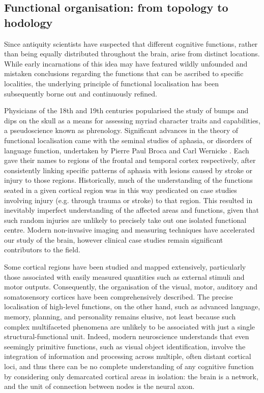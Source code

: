 \subsection{Functional organisation: from topology to hodology}

Since antiquity  scientists have suspected that different cognitive functions, rather than being equally distributed throughout the brain, arise from distinct locations.
While early incarnations of this idea may have featured wildly unfounded and mistaken conclusions regarding the functions that can be ascribed to specific localities, the underlying principle of functional localisation has been subsequently borne out and continuously refined.

Physicians of the 18th and 19th centuries popularised the study of bumps and dips on the skull as a means for assessing myriad character traits and capabilities, a pseudoscience known as phrenology.
Significant advances in the theory of functional localisation came with the seminal studies of aphasia, or disorders of language function, undertaken by Pierre Paul Broca and Carl Wernicke .
Each gave their names to regions of the frontal and temporal cortex respectively, after consistently linking specific patterns of aphasia with lesions caused by stroke or injury to those regions.
Historically, much of the understanding of the functions seated in a given cortical region was in this way predicated on case studies involving injury (e.g. through trauma or stroke) to that region.
This resulted in inevitably imperfect understanding of the affected areas and functions, given that such random injuries are unlikely to precisely take out one isolated functional centre.
Modern non-invasive imaging and measuring techniques have accelerated our study of the brain, however clinical case studies remain significant contributors to the field.

Some cortical regions have been studied and mapped extensively, particularly those associated with easily measured quantities such as external stimuli and motor outputs.
Consequently, the organisation of the visual, motor, auditory and somatosensory cortices have been comprehensively described.
The precise localisation of high-level functions, on the other hand, such as advanced language, memory, planning, and personality remains elusive, not least because such complex multifaceted phenomena are unlikely to be associated with just a single structural-functional unit.\autocite{Catani2007}
Indeed, modern neuroscience understands that even seemingly primitive functions, such as visual object identification, involve the integration of information and processing across multiple, often distant cortical loci,\autocite{ffytche2005} and thus there can be no complete understanding of any cognitive function by considering only demarcated cortical areas in isolation: the brain is a network, and the unit of connection between nodes is the neural axon.

